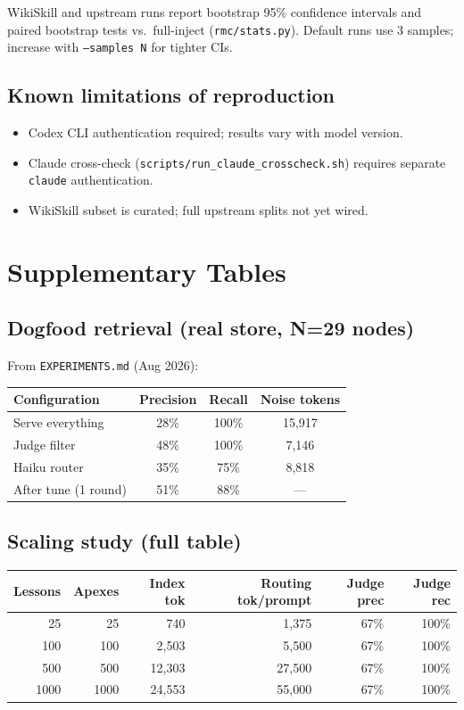 WikiSkill and upstream runs report bootstrap 95\% confidence intervals and paired bootstrap tests vs.\ full-inject (\texttt{rmc/stats.py}).
Default runs use 3 samples; increase with \texttt{--samples N} for tighter CIs.

\subsection{Known limitations of reproduction}

\begin{itemize}
  \item Codex CLI authentication required; results vary with model version.
  \item Claude cross-check (\texttt{scripts/run\_claude\_crosscheck.sh}) requires separate \texttt{claude} authentication.
  \item WikiSkill subset is curated; full upstream splits not yet wired.
\end{itemize}

\section{Supplementary Tables}

\subsection{Dogfood retrieval (real store, N=29 nodes)}

From \texttt{EXPERIMENTS.md} (Aug 2026):

\begin{table}[h]
  \centering
  \begin{tabular}{lccc}
    \toprule
    Configuration & Precision & Recall & Noise tokens \\
    \midrule
    Serve everything & 28\% & 100\% & 15,917 \\
    Judge filter & 48\% & 100\% & 7,146 \\
    Haiku router & 35\% & 75\% & 8,818 \\
    After tune (1 round) & 51\% & 88\% & --- \\
    \bottomrule
  \end{tabular}
\end{table}

\subsection{Scaling study (full table)}

\begin{table}[h]
  \centering
  \begin{tabular}{rrrrrr}
    \toprule
    Lessons & Apexes & Index tok & Routing tok/prompt & Judge prec & Judge rec \\
    \midrule
    25 & 25 & 740 & 1,375 & 67\% & 100\% \\
    100 & 100 & 2,503 & 5,500 & 67\% & 100\% \\
    500 & 500 & 12,303 & 27,500 & 67\% & 100\% \\
    1000 & 1000 & 24,553 & 55,000 & 67\% & 100\% \\
    \bottomrule
  \end{tabular}
\end{table}
